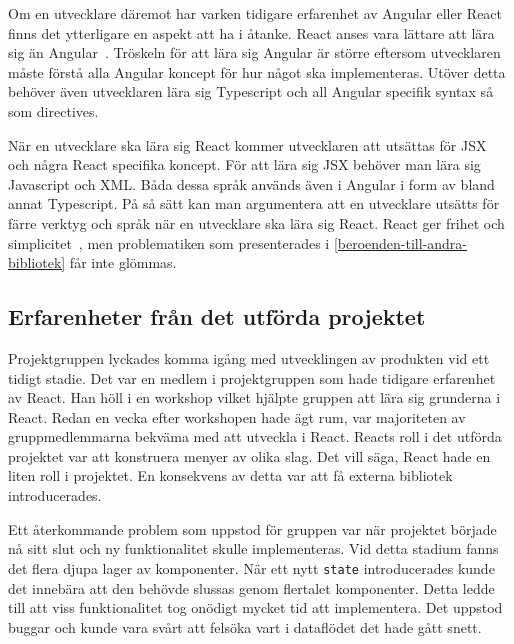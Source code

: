 Om en utvecklare däremot har varken tidigare erfarenhet av Angular eller React finns det ytterligare en aspekt att ha i åtanke. React anses vara lättare att lära sig än Angular~\cite{sitepoint}. Tröskeln för att lära sig Angular är större eftersom utvecklaren måste förstå alla Angular koncept för hur något ska implementeras. Utöver detta behöver även utvecklaren lära sig Typescript och all Angular specifik syntax så som directives. 

När en utvecklare ska lära sig React kommer utvecklaren att utsättas för JSX och några React specifika koncept. För att lära sig JSX behöver man lära sig Javascript och XML. Båda dessa språk används även i Angular i form av bland annat Typescript. På så sätt kan man argumentera att en utvecklare utsätts för färre verktyg och språk när en utvecklare ska lära sig React. React ger frihet och simplicitet~\cite{react-angular-paper}, men problematiken som presenterades i \ref{beroenden-till-andra-bibliotek} får inte glömmas.

\subsection{Erfarenheter från det utförda projektet}
Projektgruppen lyckades komma igång med utvecklingen av produkten vid ett tidigt stadie. Det var en medlem i projektgruppen som hade tidigare erfarenhet av React. Han höll i en workshop vilket hjälpte gruppen att lära sig grunderna i React. Redan en vecka efter workshopen hade ägt rum, var majoriteten av gruppmedlemmarna bekväma med att utveckla i React. Reacts roll i det utförda projektet var att konstruera menyer av olika slag. Det vill säga, React hade en liten roll i projektet. En konsekvens av detta var att få externa bibliotek introducerades. 

Ett återkommande problem som uppstod för gruppen var när projektet började nå sitt slut och ny funktionalitet skulle implementeras. Vid detta stadium fanns det flera djupa lager av komponenter. När ett nytt \texttt{state} introducerades kunde det innebära att den behövde slussas genom flertalet komponenter. Detta ledde till att viss funktionalitet tog onödigt mycket tid att implementera. Det uppstod buggar och kunde vara svårt att felsöka vart i dataflödet det hade gått snett. 


